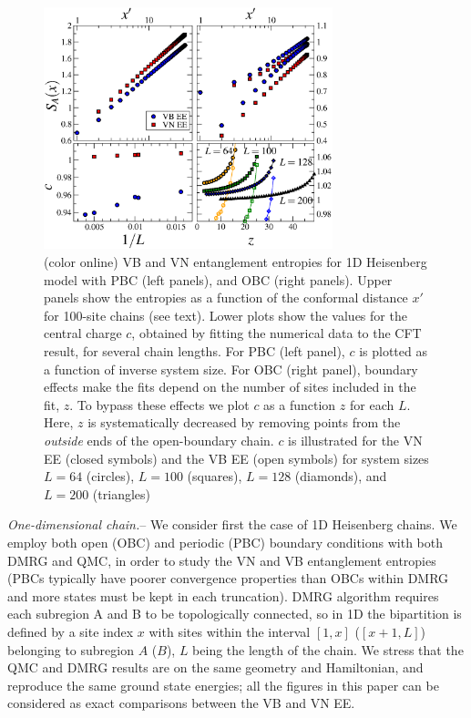 \documentclass[prl,aps,twocolumn,floatfix,amsmath,amssymb,superscriptaddress,tightenlines]{revtex4}
\begin{document}
\begin{figure} {
\includegraphics[width=3.3in]{4-panelFIG1.eps} \caption{(color online) VB
and VN entanglement entropies for 1D Heisenberg model with PBC (left
panels), and OBC (right panels). Upper panels show the entropies as a
function of the conformal distance $x'$ for 100-site chains (see text).
Lower plots show the values for the central charge $c$, obtained by
fitting the numerical data to the CFT result, for several chain lengths.
For PBC (left panel), $c$ is plotted as a function of inverse system size.
For OBC (right panel), boundary effects make the fits depend on the number
of sites included in the fit, $z$. To bypass these effects we plot $c$ as
a function $z$ for each $L$. Here, $z$ is systematically decreased by
removing points from the {\it outside} ends of the open-boundary chain.
$c$ is illustrated for the VN EE (closed symbols) and the VB EE (open
symbols) for system sizes $L=64$ (circles), $L=100$ (squares), $L=128$
(diamonds), and $L=200$ (triangles) \label{1D}}} \end{figure}

{\it One-dimensional chain.}-- We consider first the case of 1D Heisenberg
chains. We employ both open (OBC) and periodic (PBC) boundary conditions
with both DMRG and QMC, in order to study the VN and VB entanglement
entropies (PBCs typically have poorer convergence properties than OBCs
within DMRG and more states must be kept in each truncation). 
DMRG algorithm requires each subregion A and B to be topologically
connected, so in 1D the bipartition is defined by a site index $x$ with
sites within the interval $[1,x]$ ($[x+1,L]$) belonging to subregion $A$
($B$), $L$ being the length of the chain. We stress that the QMC and DMRG
results are on the same geometry and Hamiltonian, and reproduce the same
ground state energies; all the figures in this paper can be considered as
exact comparisons between the VB and VN EE. 
\end{document}
